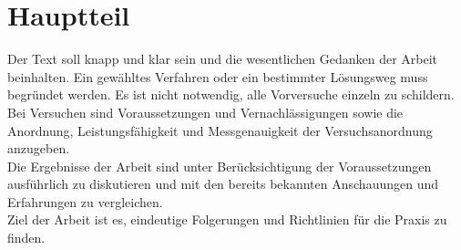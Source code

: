 
\chapter{Hauptteil}

Der Text soll knapp und klar sein und die wesentlichen Gedanken der Arbeit beinhalten. Ein gewähltes Verfahren oder ein bestimmter Lösungsweg muss begründet werden. Es ist nicht notwendig, alle Vorversuche einzeln zu schildern. Bei Versuchen sind Voraussetzungen und Vernachlässigungen sowie die Anordnung, Leistungsfähigkeit und Messgenauigkeit der Versuchsanordnung anzugeben. \\ Die Ergebnisse der Arbeit sind unter Berücksichtigung der Voraussetzungen ausführlich zu diskutieren und mit den bereits bekannten Anschauungen und Erfahrungen zu vergleichen. \\ Ziel der Arbeit ist es, eindeutige Folgerungen und Richtlinien für die Praxis zu finden.
